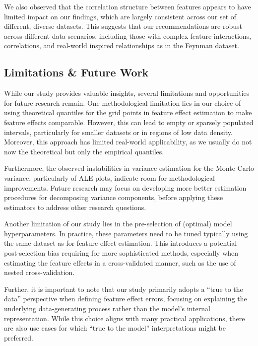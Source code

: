 \documentclass[runningheads]{llncs}
\begin{document}
We also observed that the correlation structure between features appears to have limited impact on our findings,
which are largely consistent across our set of different, diverse datasets.
This suggests that our recommendations are robust across different data scenarios,
including those with complex feature interactions, correlations, 
and real-world inspired relationships as in the Feynman dataset.

\subsection{Limitations \& Future Work}

While our study provides valuable insights, several limitations and opportunities
for future research remain. One methodological limitation lies in our choice of using
theoretical quantiles for the grid points in feature effect estimation to make feature
effects comparable. However, this can lead to empty or sparsely populated intervals, particularly for smaller
datasets or in regions of low data density. Moreover, this approach has limited real-world
applicability, as we usually do not now the theoretical but only the empirical quantiles.

Furthermore, the observed instabilities in variance estimation for the Monte Carlo variance,
particularly of ALE plots, indicate room for methodological improvements. Future research may
focus on developing more better estimation procedures for decomposing variance components,
before applying these estimators to address other research questions.

Another limitation of our study lies in the pre-selection of (optimal) model hyperparameters.
In practice, these parameters need to be tuned typically using the same dataset as for feature
effect estimation. This introduces a potential post-selection bias requiring for more sophisticated
methods, especially when estimating the feature effects in a cross-validated manner, such as
the use of nested cross-validation.

Further, it is important to note that our study primarily adopts a ``true to the data'' perspective
when defining feature effect errors, focusing on explaining the underlying data-generating process
rather than the model's internal representation. While this choice aligns with many practical
applications, there are also use cases for which ``true to the model'' interpretations might be 
preferred.
\end{document}
